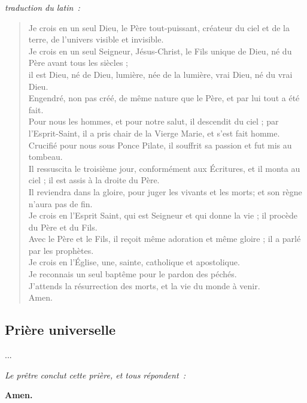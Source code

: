 \emph{traduction du latin~:}
\begin{verse}
 Je crois en un seul Dieu, le Père tout-puissant, créateur du ciel et de la terre, de l'univers visible et invisible. \\
 Je crois en un seul Seigneur, Jésus-Christ, le Fils unique de Dieu, né du Père avant tous les siècles ;\\
 il est Dieu, né de Dieu, lumière, née de la lumière, vrai Dieu, né du vrai Dieu. \\
 Engendré, non pas créé, de même nature que le Père, et par lui tout a été fait. \\
 Pour nous les hommes, et pour notre salut, il descendit du ciel ; par l'Esprit-Saint, il a pris chair de la Vierge Marie, et s'est fait homme. \\
 Crucifié pour nous sous Ponce Pilate, il souffrit sa passion et fut mis au tombeau. \\
 Il ressuscita le troisième jour, conformément aux Écritures, et il monta au ciel ; il est assis à la droite du Père. \\
 Il reviendra dans la gloire, pour juger les vivants et les morts; et son règne n'aura pas de fin.\\
 Je crois en l'Esprit Saint, qui est Seigneur et qui donne la vie ; il procède du Père et du Fils. \\
 Avec le Père et le Fils, il reçoit même adoration et même gloire ; il a parlé par les prophètes. \\
 Je crois en l'Église, une, sainte, catholique et apostolique. \\
 Je reconnais un seul baptême pour le pardon des péchés. \\
 J'attends la résurrection des morts, et la vie du monde à venir. \\
 Amen.
\end{verse}




\subsection*{Prière universelle}

...

\emph{Le prêtre conclut cette prière, et tous répondent~:}

{\bf Amen.}



